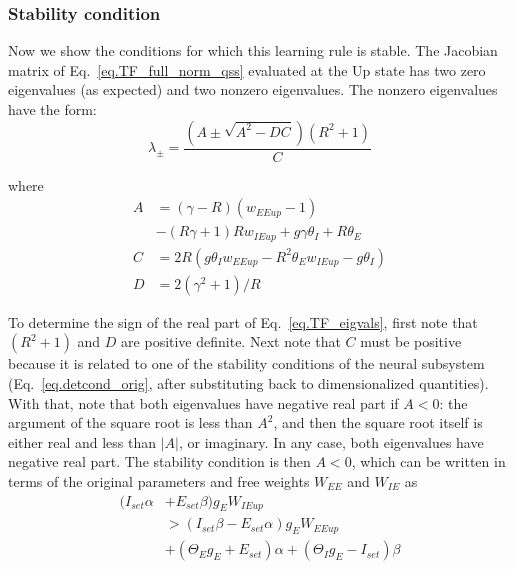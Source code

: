 \documentclass[
twocolumn,
]{article}
\newcommand{\EE}{\mathit{EE}}
\newcommand{\IE}{\mathit{IE}}
\newcommand{\set}{\mathit{set}}
\newcommand{\up}{\mathit{up}}
\begin{document}
\subsubsection{Stability condition}

Now we show the conditions for which this learning rule is stable. The Jacobian matrix of Eq.\ \ref{eq.TF_full_norm_qss} evaluated at the Up state has two zero eigenvalues (as expected) and two nonzero eigenvalues. The nonzero eigenvalues have the form:
\begin{equation}
\lambda_{\pm} = \frac{\left(A \pm \sqrt{A^2 - DC}\right)(R^2+1)}{C}
\label{eq.TF_eigvals}
\end{equation}

\noindent where
\begin{displaymath}
\begin{aligned}
A & = (\gamma - R) (w_{\EE\up} - 1) \\
& - (R \gamma + 1)R w_{\IE\up} + g \gamma \theta_I + R \theta_E \\
C & = 2R(g\theta_I w_{\EE\up} - R^2\theta_E w_{\IE\up}  - g\theta_I) \\
D & = 2(\gamma^2 + 1)/R
\end{aligned}
\end{displaymath}

To determine the sign of the real part of Eq.\ \ref{eq.TF_eigvals}, first note that $(R^2+1)$ and $D$ are positive definite. Next note that $C$ must be positive because it is related to one of the stability conditions of the neural subsystem (Eq.\ \ref{eq.detcond_orig}, after substituting back to dimensionalized quantities). With that, note that both eigenvalues have negative real part if $A<0$: the argument of the square root is less than $A^2$, and then the square root itself is either real and less than $|A|$, or imaginary. In any case, both eigenvalues have negative real part. The stability condition is then $A<0$, which can be written in terms of the original parameters and free weights $W_{\EE}$ and $W_{\IE}$ as
\begin{equation}
\begin{aligned}
(I_{\set} \alpha & + E_{\set} \beta) g_E W_{\IE\up} \\
& > (I_{\set} \beta - E_{\set} \alpha) g_E W_{\EE\up} \\
& + (\Theta_E g_E + E_{\set}) \alpha + (\Theta_I g_E - I_{\set}) \beta
\end{aligned}
\label{eq.TF_stable_cond}
\end{equation}
\end{document}
